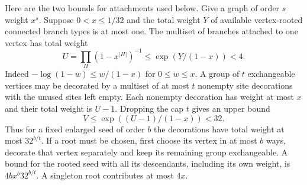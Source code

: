 \documentclass[11pt]{article}
\begin{document}
Here are the two bounds for attachments used below. Give a graph of order $s$ weight $x^s$. Suppose $0<x\le1/32$ and the total weight $Y$ of available vertex-rooted connected branch types is at most one. The multiset of branches attached to one vertex has total weight
\[
 U=\prod_H(1-x^{|H|})^{-1}\le \exp(Y/(1-x))<4 .
\]
Indeed $-\log(1-w)\le w/(1-x)$ for $0\le w\le x$. A group of $t$ exchangeable vertices may be decorated by a multiset of at most $t$ nonempty site decorations with the unused sites left empty. Each nonempty decoration has weight at most $x$ and their total weight is $U-1$. Dropping the cap $t$ gives an upper bound
\[
 V\le \exp((U-1)/(1-x))<32.
\]
Thus for a fixed enlarged seed of order $b$ the decorations have total weight at most $32^{b/t}$. If a root must be chosen, first choose its vertex in at most $b$ ways, decorate that vertex separately and keep its remaining group exchangeable. A bound for the rooted seed with all its descendants, including its own weight, is $4b x^b32^{b/t}$. A singleton root contributes at most $4x$.
\end{document}
